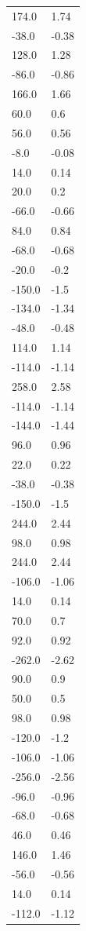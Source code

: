 \begin{longtable}{ll}
174.0 & 1.74 \\
-38.0 & -0.38 \\
128.0 & 1.28 \\
-86.0 & -0.86 \\
166.0 & 1.66 \\
60.0 & 0.6 \\
56.0 & 0.56 \\
-8.0 & -0.08 \\
14.0 & 0.14 \\
20.0 & 0.2 \\
-66.0 & -0.66 \\
84.0 & 0.84 \\
-68.0 & -0.68 \\
-20.0 & -0.2 \\
-150.0 & -1.5 \\
-134.0 & -1.34 \\
-48.0 & -0.48 \\
114.0 & 1.14 \\
-114.0 & -1.14 \\
258.0 & 2.58 \\
-114.0 & -1.14 \\
-144.0 & -1.44 \\
96.0 & 0.96 \\
22.0 & 0.22 \\
-38.0 & -0.38 \\
-150.0 & -1.5 \\
244.0 & 2.44 \\
98.0 & 0.98 \\
244.0 & 2.44 \\
-106.0 & -1.06 \\
14.0 & 0.14 \\
70.0 & 0.7 \\
92.0 & 0.92 \\
-262.0 & -2.62 \\
90.0 & 0.9 \\
50.0 & 0.5 \\
98.0 & 0.98 \\
-120.0 & -1.2 \\
-106.0 & -1.06 \\
-256.0 & -2.56 \\
-96.0 & -0.96 \\
-68.0 & -0.68 \\
46.0 & 0.46 \\
146.0 & 1.46 \\
-56.0 & -0.56 \\
14.0 & 0.14 \\
-112.0 & -1.12 \\

\end{longtable}
